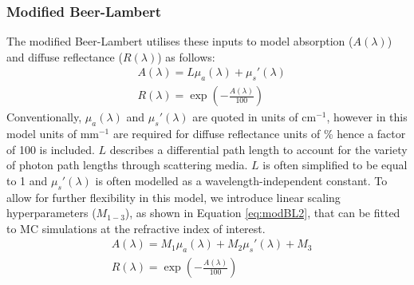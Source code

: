 \subsubsection{Modified Beer-Lambert}
The modified Beer-Lambert utilises these inputs to model absorption ($A(\lambda)$) and diffuse reflectance ($R(\lambda)$) as follows: 
\begin{equation}
\begin{aligned}
    & A(\lambda) = L\mu_a(\lambda) + \mu_s'(\lambda) \\
    & R(\lambda) = \exp{\left(-\frac{A(\lambda)}{100}\right)}
\end{aligned}
\label{eq:modBL1}
\end{equation}
Conventionally, $\mu_a(\lambda)$ and $\mu_s'(\lambda)$ are quoted in units of cm\textrm{$^{-1}$}, however in this model units of mm\textrm{$^{-1}$} are required for diffuse reflectance units of \% hence a factor of 100 is included. $L$ describes a differential path length to account for the variety of photon path lengths through scattering media. $L$ is often simplified to be equal to 1 \cite{Clancy2015} and $\mu_s'(\lambda)$ is often modelled as a wavelength-independent constant\cite{Clancy2015, Ma2016}. 
To allow for further flexibility in this model,
we introduce linear scaling hyperparameters ($M_{1-3}$), as shown in Equation \eqref{eq:modBL2}, that can be fitted to MC simulations at the refractive index of interest. 
\begin{equation}
\begin{aligned}
    & A(\lambda) = M_1\mu_a(\lambda) + M_2\mu_s'(\lambda) + M_3 \\
    & R(\lambda) = \exp{\left(-\frac{A(\lambda)}{100}\right)}
\end{aligned}
\label{eq:modBL2}
\end{equation}

